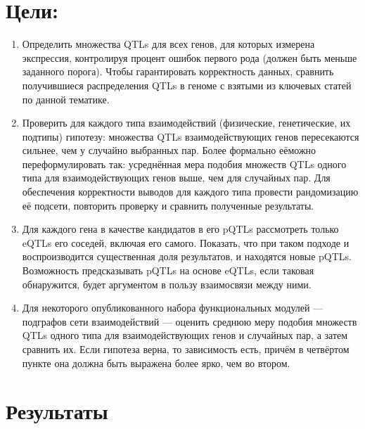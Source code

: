 \documentclass[11pt,a4paper]{report}
\theoremstyle{definition}
\theoremstyle{definition}
\theoremstyle{definition}
\begin{document}
	\section{Цели:}
	\begin{enumerate}
		\item Определить множества QTLs для всех генов, для которых измерена экспрессия, контролируя процент ошибок первого рода (должен быть меньше заданного порога). Чтобы гарантировать корректность данных, сравнить получившиеся распределения QTLs в геноме с взятыми из ключевых статей по данной тематике.
		\item Проверить для каждого типа взаимодействий (физические, генетические, их подтипы) гипотезу: множества QTLs взаимодействующих генов пересекаются сильнее, чем у случайно выбранных пар. Более формально еёможно переформулировать так: усреднённая мера подобия множеств QTLs одного типа для взаимодействующих генов выше, чем для случайных пар. Для обеспечения корректности выводов для каждого типа провести рандомизацию её подсети, повторить проверку и сравнить полученные результаты.
		\item Для каждого гена в качестве кандидатов в его pQTLs рассмотреть только eQTLs его соседей, включая его самого. Показать, что при таком подходе и воспроизводится существенная доля результатов, и находятся новые pQTLs. Возможность предсказывать pQTLs на основе eQTLs, если таковая обнаружится, будет аргументом в пользу взаимосвязи между ними.
		\item Для некоторого опубликованного набора функциональных модулей — подграфов сети взаимодействий — оценить среднюю меру подобия множеств QTLs одного типа для взаимодействующих генов и случайных пар, а затем сравнить их. Если гипотеза верна, то зависимость есть, причём в четвёртом пункте она должна быть выражена более ярко, чем во втором.
	\end{enumerate}
	
	\section{Результаты}
\end{document}
